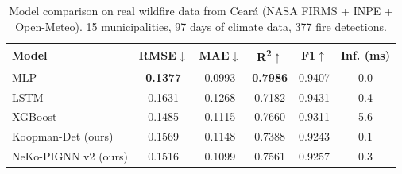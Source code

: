 \begin{table}[htbp]
\centering
\caption{Model comparison on real wildfire data from Cear\'a (NASA FIRMS + INPE + Open-Meteo). 15 municipalities, 97 days of climate data, 377 fire detections.}
\label{tab:real_data}
\small
\begin{tabular}{@{}lccccc@{}}
\toprule
\textbf{Model} & \textbf{RMSE}$\downarrow$ & \textbf{MAE}$\downarrow$ & \textbf{R\textsuperscript{2}}$\uparrow$ & \textbf{F1}$\uparrow$ & \textbf{Inf. (ms)} \\
\midrule
MLP & \textbf{0.1377} & 0.0993 & \textbf{0.7986} & 0.9407 & 0.0 \\
LSTM & 0.1631 & 0.1268 & 0.7182 & 0.9431 & 0.4 \\
XGBoost & 0.1485 & 0.1115 & 0.7660 & 0.9311 & 5.6 \\
Koopman-Det (ours) & 0.1569 & 0.1148 & 0.7388 & 0.9243 & 0.1 \\
NeKo-PIGNN v2 (ours) & 0.1516 & 0.1099 & 0.7561 & 0.9257 & 0.3 \\
\bottomrule
\end{tabular}
\end{table}